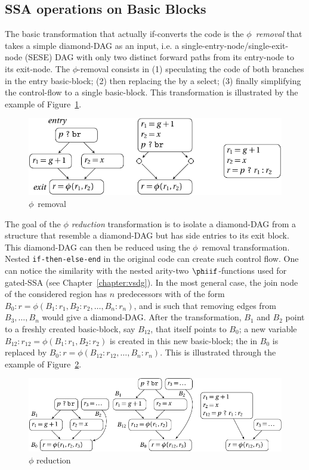 \subsection{SSA operations on Basic Blocks}



The basic transformation that actually if-converts the code is the \emph{$\phi$~removal} that takes a simple diamond-DAG  as an input, i.e. a single-entry-node/single-exit-node (SESE) DAG with only two distinct forward paths from its entry-node to its exit-node. The $\phi$-removal consists in (1) speculating the code of both branches in the entry basic-block; (2) then replacing the \phifun by a select; (3) finally simplifying the control-flow to a single basic-block. This transformation is illustrated by the example of Figure~\ref{fig:phi_rem}. 
\begin{figure}[h]
  \includegraphics[scale=0.9]{phi_removal}
  \caption{$\phi$~removal\label{fig:phi_rem}}
\end{figure}


The goal of the \emph{$\phi$ reduction} transformation is to isolate a diamond-DAG from a structure that resemble a diamond-DAG but has side entries to its exit block. This diamond-DAG can then be reduced using the $\phi$~removal transformation. Nested \texttt{if-then-else-end} in the original code can create such control flow. One can notice the similarity with the nested arity-two $\phiif$-functions used for gated-SSA (see Chapter~\ref{chapter:vsdg}). In the most general case, the join node of the considered region has $n$ predecessors with \phifuns of the form $B_0:r=\phi(B_1:r_1,B_2:r_2,\dots,B_n:r_n)$, and is such that removing edges from $B_3,\dots, B_n$ would give a diamond-DAG. After the transformation, $B_1$ and $B_2$ point to a freshly created basic-block, say $B_{12}$, that itself points to $B_0$; a new variable $B_{12}:r_{12}=\phi(B_1:r_1,B_2:r_2)$ is created in this new basic-block; the \phifun in $B_0$ is replaced by $B_0:r=\phi(B_{12}:r_{12},\dots,B_n:r_n)$. This is illustrated through the example of Figure~\ref{fig:phi_red}.
\begin{figure}[h]
  \includegraphics[scale=0.9]{phi_reduction}
  \caption{\label{fig:phi_red}$\phi$ reduction}
\end{figure}

